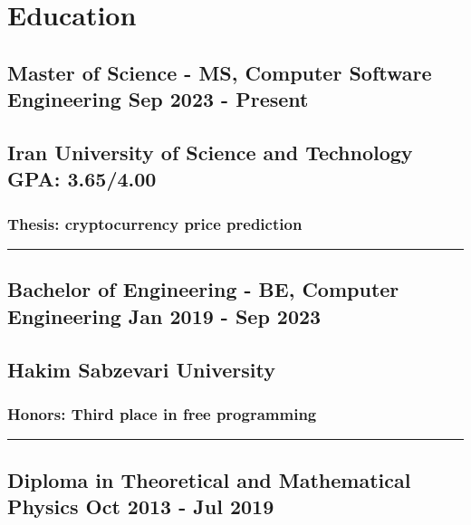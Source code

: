 \documentclass[11pt]{article}
\begin{document}
\section{Education}
\subsection{Master of Science - MS, Computer Software Engineering \hfill Sep 2023 - Present}
\subsection{\textcolor{primaryColor}{\faUniversity}\hspace{0.5em}Iran University of Science and Technology \hfill GPA: 3.65/4.00}
\subsubsection{\textcolor{primaryColor}{\faFile}\hspace{0.5em}Thesis: cryptocurrency price prediction}

\vspace{1em}
\noindent\hspace*{\fill}\textcolor{primaryColor}{\rule[0.5ex]{.65\linewidth}{0.1mm}}\hspace*{\fill}

\subsection{Bachelor of Engineering - BE, Computer Engineering \hfill Jan 2019 - Sep 2023}
\subsection{\textcolor{primaryColor}{\faUniversity}\hspace{0.5em}Hakim Sabzevari University}
\subsubsection{\textcolor{primaryColor}{\faGraduationCap}\hspace{0.5em} Honors: Third place in free programming}

\vspace{1em}
\noindent\hspace*{\fill}\textcolor{primaryColor}{\rule[0.5ex]{.65\linewidth}{0.1mm}}\hspace*{\fill}

\subsection{Diploma in Theoretical and Mathematical
Physics \hfill Oct 2013 - Jul 2019}
\end{document}
